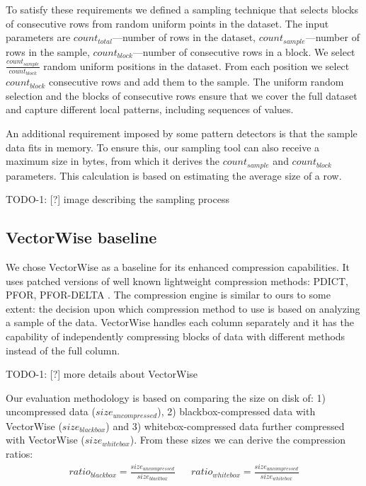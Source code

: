 To satisfy these requirements we defined a sampling technique that selects blocks of consecutive rows from random uniform points in the dataset. The input parameters are \(count_{total}\)---number of rows in the dataset, \(count_{sample}\)---number of rows in the sample, \(count_{block}\)---number of consecutive rows in a block. We select \(\frac{count_{sample}}{count_{block}}\) random uniform positions in the dataset. From each position we select \(count_{block}\) consecutive rows and add them to the sample. The uniform random selection and the blocks of consecutive rows ensure that we cover the full dataset and capture different local patterns, including sequences of values.

An additional requirement imposed by some pattern detectors is that the sample data fits in memory. To ensure this, our sampling tool can also receive a maximum size in bytes, from which it derives the \(count_{sample}\) and \(count_{block}\) parameters. This calculation is based on estimating the average size of a row.

TODO-1: [?] image describing the sampling process



\subsection{VectorWise baseline}
\label{subsec:eval:methodology:vectorwise}

We chose VectorWise as a baseline for its enhanced compression capabilities. It uses patched versions of well known lightweight compression methods: PDICT, PFOR, PFOR-DELTA \cite{zukowski2006super}. The compression engine is similar to ours to some extent: the decision upon which compression method to use is based on analyzing a sample of the data. VectorWise handles each column separately and it has the capability of independently compressing blocks of data with different methods instead of the full column.

TODO-1: [?] more details about VectorWise

Our evaluation methodology is based on comparing the size on disk of: 1) uncompressed data (\(size_{uncompressed}\)), 2) blackbox-compressed data with VectorWise (\(size_{blackbox}\)) and 3) whitebox-compressed data further compressed with VectorWise (\(size_{whitebox}\)). From these sizes we can derive the compression ratios:
\begin{align}
\label{eq:eval:vectorwise:ratios}
    \mathit{ratio_{blackbox}} = \frac{size_{uncompressed}}{size_{blackbox}} && 
    \mathit{ratio_{whitebox}} = \frac{size_{uncompressed}}{size_{whitebox}}
\end{align}

